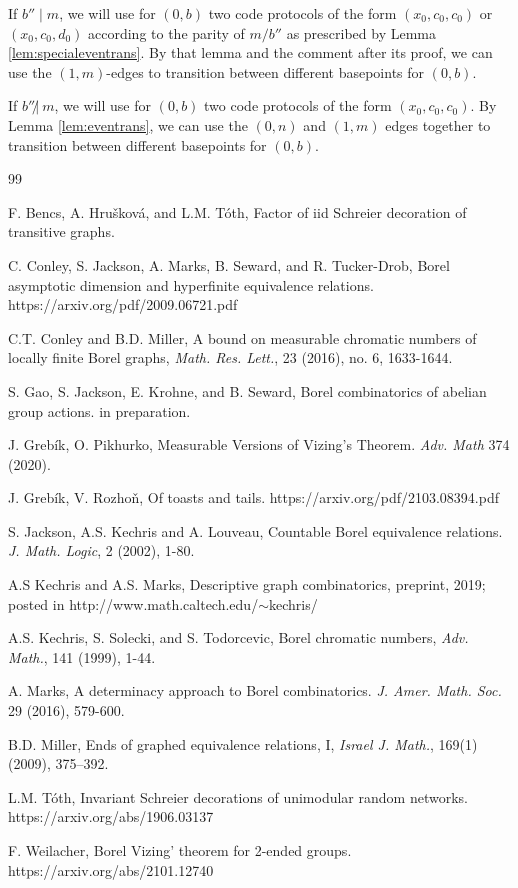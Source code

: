\documentclass[10pt,a4paper]{article}
\newcommand{\0}{\varnothing}
\begin{document}
If $b'' \mid m$, we will use for $(0,b)$ two code protocols of the form $(x_0,c_0,c_0)$ or $(x_0,c_0,d_0)$ according to the parity of $m/b''$ as prescribed by Lemma \ref{lem:specialeventrans}. By that lemma and the comment after its proof, we can use the $(1,m)$-edges to transition between different basepoints for $(0,b)$.

If $b'' \not|\ m$, we will use for $(0,b)$ two code protocols of the form $(x_0,c_0,c_0)$. By Lemma \ref{lem:eventrans}, we can use the $(0,n)$ and $(1,m)$ edges together to transition between different basepoints for $(0,b)$.

\begin{thebibliography}{99}

 F. Bencs, A. Hru\v{s}kov\'{a}, and L.M. T\'{o}th, Factor of iid Schreier decoration of transitive graphs.

 C. Conley, S. Jackson, A. Marks, B. Seward, and R. Tucker-Drob, Borel asymptotic dimension and hyperfinite equivalence relations. https://arxiv.org/pdf/2009.06721.pdf

 C.T. Conley and B.D. Miller, A bound on measurable chromatic numbers of locally finite Borel graphs, \textit{Math. Res. Lett.}, 23 (2016), no. 6, 1633-1644.

 S. Gao, S. Jackson, E. Krohne, and B. Seward, Borel combinatorics of abelian group actions. in preparation.

 J. Greb\'{i}k, O. Pikhurko, Measurable Versions of Vizing's Theorem. \textit{Adv. Math} 374 (2020).

 J. Greb\'{i}k, V. Rozho\v{n}, Of toasts and tails. \textnormal{https://arxiv.org/pdf/2103.08394.pdf}

 S. Jackson, A.S. Kechris and A. Louveau, Countable Borel equivalence relations. \textit{J. Math. Logic}, 2 (2002), 1-80.

 A.S Kechris and A.S. Marks, Descriptive graph combinatorics, preprint, 2019; posted in \textnormal{http://www.math.caltech.edu/$\sim$kechris/}

 A.S. Kechris, S. Solecki, and S. Todorcevic, Borel chromatic numbers, \textit{Adv. Math.}, 141 (1999), 1-44.

 A. Marks, A determinacy approach to Borel combinatorics. \textit{J. Amer. Math. Soc.} 29 (2016), 579-600.

 B.D. Miller, Ends of graphed equivalence relations, I, \textit{Israel J.
Math.}, 169(1) (2009), 375–392.

 L.M. T\'{o}th, Invariant Schreier decorations of unimodular random networks. https://arxiv.org/abs/1906.03137

 F. Weilacher, Borel Vizing' theorem for 2-ended groups. https://arxiv.org/abs/2101.12740



\end{thebibliography}
\end{document}
